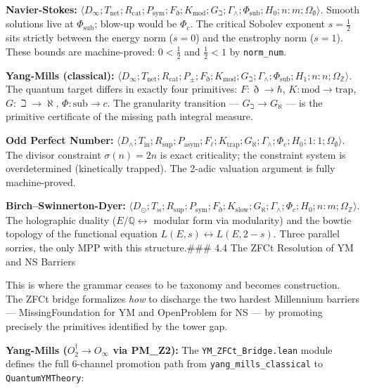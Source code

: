 \documentclass[12pt,a4paper]{article}
\begin{document}
\textbf{Navier-Stokes:} $\langle D_{\infty}; T_{\text{net}}; R_{\text{cat}}; P_{\text{sym}}; F_{\eth}; K_{\text{mod}}; G_{\beth}; \Gamma_{\wedge}; \Phi_{\text{sub}}; H_0; n{:}m; \Omega_{\emptyset} \rangle$. Smooth solutions live at $\Phi_{\text{sub}}$; blow-up would be $\Phi_c$. The critical Sobolev exponent $s = \frac{1}{2}$ sits strictly between the energy norm ($s = 0$) and the enstrophy norm ($s = 1$). These bounds are machine-proved: $0 < \frac{1}{2}$ and $\frac{1}{2} < 1$ by \texttt{norm\_num}.

\textbf{Yang-Mills (classical):} $\langle D_{\infty}; T_{\text{net}}; R_{\text{cat}}; P_{\pm}; F_{\eth}; K_{\text{mod}}; G_{\beth}; \Gamma_{\wedge}; \Phi_{\text{sub}}; H_1; n{:}n; \Omega_\mathbb{Z} \rangle$. The quantum target differs in exactly four primitives: $F: \eth \to \hbar$, $K: \text{mod} \to \text{trap}$, $G: \beth \to \aleph$, $\Phi: \text{sub} \to c$. The granularity transition --- $G_{\beth} \to G_{\aleph}$ --- is the primitive certificate of the missing path integral measure.

\textbf{Odd Perfect Number:} $\langle D_{\wedge}; T_{\text{in}}; R_{\text{sup}}; P_{\text{asym}}; F_{\ell}; K_{\text{trap}}; G_{\aleph}; \Gamma_{\wedge}; \Phi_c; H_0; 1{:}1; \Omega_{\emptyset} \rangle$. The divisor constraint $\sigma(n) = 2n$ is exact criticality; the constraint system is overdetermined (kinetically trapped). The 2-adic valuation argument is fully machine-proved.

\textbf{Birch--Swinnerton-Dyer:} $\langle D_{\odot}; T_{\bowtie}; R_{\text{sup}}; P_{\text{sym}}; F_{\eth}; K_{\text{slow}}; G_{\aleph}; \Gamma_{\wedge}; \Phi_c; H_0; n{:}m; \Omega_\mathbb{Z} \rangle$. The holographic duality ($E/\mathbb{Q} \leftrightarrow$ modular form via modularity) and the bowtie topology of the functional equation $L(E, s) \leftrightarrow L(E, 2-s)$. Three parallel sorries, the only MPP with this structure.\#\#\# 4.4 The ZFCt Resolution of YM and NS Barriers

This is where the grammar ceases to be taxonomy and becomes construction. The ZFCt bridge formalizes \emph{how} to discharge the two hardest Millennium barriers --- MissingFoundation for YM and OpenProblem for NS --- by promoting precisely the primitives identified by the tower gap.

\textbf{Yang-Mills ($O_2^\dagger \to O_{\infty}$ via PM\_Z2):}
The \texttt{YM\_ZFCt\_Bridge.lean} module defines the full 6-channel promotion path from \texttt{yang\_mills\_classical} to \texttt{QuantumYMTheory}:
\end{document}
